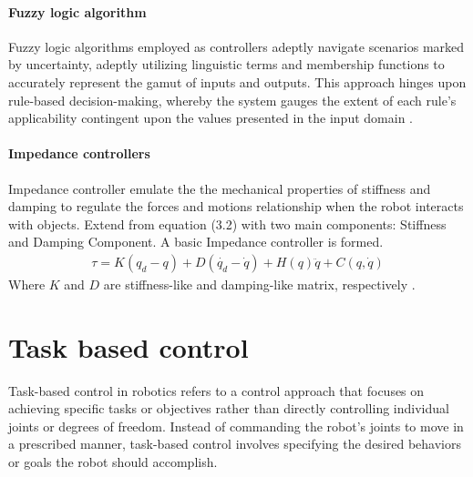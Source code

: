 \documentclass[report.tex]{subfiles}
\begin{document}
    \paragraph*{\large{Fuzzy logic algorithm}\\}
    Fuzzy logic algorithms employed as controllers adeptly navigate scenarios marked by uncertainty, adeptly utilizing linguistic terms and membership functions to accurately represent the gamut of inputs and outputs. This approach hinges upon rule-based decision-making, whereby the system gauges the extent of each rule's applicability contingent upon the values presented in the input domain \cite{dadios2012fuzzy}.
    \paragraph*{\large{Impedance controllers}\\}
    Impedance controller emulate the the mechanical properties of stiffness and damping to regulate the forces and motions relationship when the robot interacts with objects. Extend from equation (3.2) with two main components: Stiffness and Damping Component. A basic Impedance controller is formed.
    \begin{align}
            \tau  = K(q_d -q) + D (\dot{q_d} - \dot{q}) + H(q)\ddot{q}+ C(q,\dot{q})
    \end{align}
    Where $K$ and $D$ are stiffness-like and damping-like matrix, respectively \cite{song2017impedance}.
    \section{Task based control}
    Task-based control in robotics refers to a control approach that focuses on achieving specific tasks or objectives rather than directly controlling individual joints or degrees of freedom. Instead of commanding the robot's joints to move in a prescribed manner, task-based control involves specifying the desired behaviors or goals the robot should accomplish.
\end{document}
